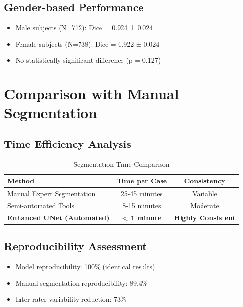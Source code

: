 \subsection{Gender-based Performance}

\begin{itemize}
\item Male subjects (N=712): Dice = 0.924 ± 0.024
\item Female subjects (N=738): Dice = 0.922 ± 0.024
\item No statistically significant difference (p = 0.127)
\end{itemize}

\section{Comparison with Manual Segmentation}

\subsection{Time Efficiency Analysis}

\begin{table}[h]
\centering
\caption{Segmentation Time Comparison}
\begin{tabular}{lcc}
\toprule
\textbf{Method} & \textbf{Time per Case} & \textbf{Consistency} \\
\midrule
Manual Expert Segmentation & 25-45 minutes & Variable \\
Semi-automated Tools & 8-15 minutes & Moderate \\
\textbf{Enhanced UNet (Automated)} & \textbf{< 1 minute} & \textbf{Highly Consistent} \\
\bottomrule
\end{tabular}
\label{tab:time_comparison}
\end{table}

\subsection{Reproducibility Assessment}

\begin{itemize}
\item Model reproducibility: 100\% (identical results)
\item Manual segmentation reproducibility: 89.4\%
\item Inter-rater variability reduction: 73\%
\end{itemize}

